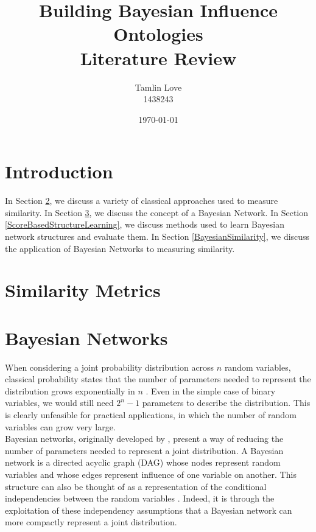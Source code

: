 \documentclass [11pt]{article}
\title{Building Bayesian Influence Ontologies\\Literature Review}
\author{Tamlin Love\\1438243}
\date{\today}
\begin{document}
\maketitle
\section{Introduction}
In Section \ref{SimilarityMetrics}, we discuss a variety of classical approaches used to measure similarity. In Section \ref{BayesianNetworks}, we discuss the concept of a Bayesian Network. In Section \ref{ScoreBasedStructureLearning}, we discuss methods used to learn Bayesian network structures and evaluate them. In Section \ref{BayesianSimilarity}, we discuss the application of Bayesian Networks to measuring similarity.
\section{Similarity Metrics}\label{SimilarityMetrics}
\section{Bayesian Networks}\label{BayesianNetworks}
When considering a joint probability distribution across $n$ random variables, classical probability states that the number of parameters needed to represent the distribution grows exponentially in $n$ \citep{koller09}. Even in the simple case of binary variables, we would still need $2^n -1$ parameters to describe the distribution. This is clearly unfeasible for practical applications, in which the number of random variables can grow very large. 
\\
Bayesian networks, originally developed by \citet{pearl88}, present a way of reducing the number of parameters needed to represent a joint distribution. A Bayesian network is a directed acyclic graph (DAG) whose nodes represent random variables and whose edges represent influence of one variable on another. This structure can also be thought of as a representation of the conditional independencies between the random variables \citep{koller09}. Indeed, it is through the exploitation of these independency assumptions that a Bayesian network can more compactly represent a joint distribution.
\end{document}
